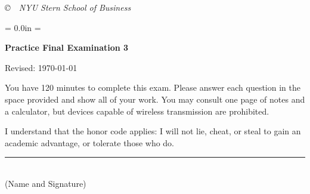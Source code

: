 \documentclass[letterpaper,12pt]{exam}
\def\HeadName{Practice Final Examination 1}
\begin{document}


\vfill \centerline{\it \copyright \ \number\year \
NYU Stern School of Business}

\newpage
\def\HeadName{Practice Final Examination 3}
\parindent = 0.0in
\parskip = \bigskipamount
\thispagestyle{empty}%
\Head

\centerline{\large \bf \HeadName}%
\centerline{Revised:  \today}

\bigskip
You have 120 minutes to complete this exam.  Please answer each
question in the space provided and show all of your work.
You may consult one page of notes and a calculator,
but devices capable of wireless transmission are prohibited.

I understand that the honor code applies: I will not lie, cheat,
or steal to gain an academic advantage, or tolerate those who do.

\begin{flushright}
\rule{4in}{0.5pt} \\ (Name and Signature)
\end{flushright}
\end{document}
